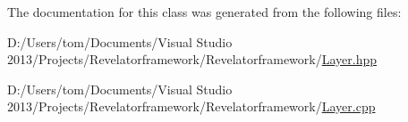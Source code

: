 The documentation for this class was generated from the following files\-:\begin{DoxyCompactItemize}
\item 
D\-:/\-Users/tom/\-Documents/\-Visual Studio 2013/\-Projects/\-Revelatorframework/\-Revelatorframework/\hyperlink{_layer_8hpp}{Layer.\-hpp}\item 
D\-:/\-Users/tom/\-Documents/\-Visual Studio 2013/\-Projects/\-Revelatorframework/\-Revelatorframework/\hyperlink{_layer_8cpp}{Layer.\-cpp}\end{DoxyCompactItemize}
